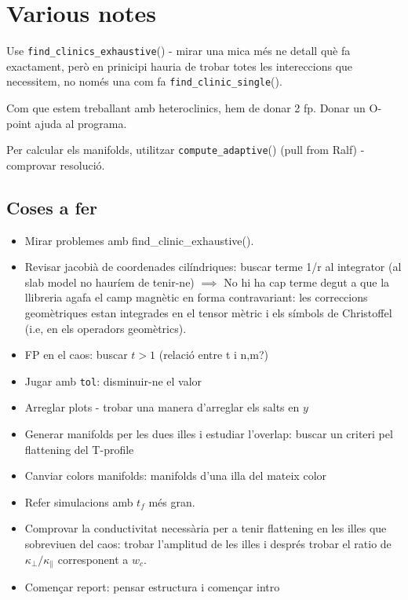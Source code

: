 \section{Various notes}

Use \texttt{find\_clinics\_exhaustive}() - mirar una mica més ne detall què fa exactament, però en prinicipi hauria de trobar totes les intereccions que necessitem, no només una com fa \texttt{find\_clinic\_single}().

Com que estem treballant amb heteroclinics, hem de donar 2 fp. Donar un O-point ajuda al programa.

Per calcular els manifolds, utilitzar \texttt{compute\_adaptive}() (pull from Ralf) - comprovar resolució.

\subsection{Coses a fer}

\begin{itemize}
    \item[\checkmark] Mirar problemes amb find\_clinic\_exhaustive().
    \item[\checkmark] Revisar jacobià de coordenades cilíndriques: buscar terme 1/r al integrator (al slab model no hauríem de tenir-ne) $\implies$ No hi ha cap terme degut a que la llibreria agafa el camp magnètic en forma contravariant: les correccions geomètriques estan integrades en el tensor mètric i els símbols de Christoffel (i.e, en els operadors geomètrics).
    \item[\checkmark] FP en el caos: buscar $t>1$ (relació entre t i n,m?)
    \item[\checkmark] Jugar amb \texttt{tol}: disminuir-ne el valor
    \item[\checkmark] Arreglar plots - trobar una manera d'arreglar els salts en $y$
    \item Generar manifolds per les dues illes  i estudiar l'overlap: buscar un criteri pel flattening del T-profile
    \item[\checkmark] Canviar colors manifolds: manifolds d'una illa del mateix color
    \item Refer simulacions amb $t_f$ més gran. 
    \item Comprovar la conductivitat necessària per a tenir flattening en les illes que sobreviuen del caos: trobar l'amplitud de les illes i després trobar el ratio de $\kappa_\perp/\kappa_\parallel$ corresponent a $w_c$.
    \item Començar report: pensar estructura i començar intro
\end{itemize}


